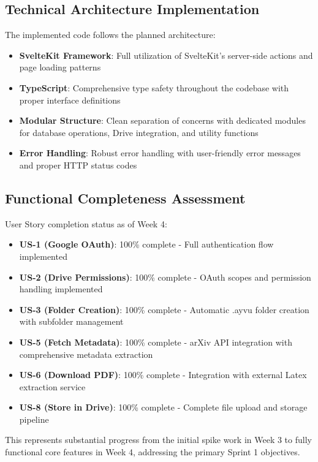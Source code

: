 \documentclass[12pt]{article}
\begin{document}
\subsection{Technical Architecture Implementation}
The implemented code follows the planned architecture:

\begin{itemize}
  \item \textbf{SvelteKit Framework}: Full utilization of SvelteKit's server-side actions and page loading patterns
  \item \textbf{TypeScript}: Comprehensive type safety throughout the codebase with proper interface definitions
  \item \textbf{Modular Structure}: Clean separation of concerns with dedicated modules for database operations, Drive integration, and utility functions
  \item \textbf{Error Handling}: Robust error handling with user-friendly error messages and proper HTTP status codes
\end{itemize}

\subsection{Functional Completeness Assessment}
User Story completion status as of Week 4:

\begin{itemize}
  \item \textbf{US-1 (Google OAuth)}: 100\% complete - Full authentication flow implemented
  \item \textbf{US-2 (Drive Permissions)}: 100\% complete - OAuth scopes and permission handling implemented
  \item \textbf{US-3 (Folder Creation)}: 100\% complete - Automatic .ayvu folder creation with subfolder management
  \item \textbf{US-5 (Fetch Metadata)}: 100\% complete - arXiv API integration with comprehensive metadata extraction
  \item \textbf{US-6 (Download PDF)}: 100\% complete - Integration with external Latex extraction service
  \item \textbf{US-8 (Store in Drive)}: 100\% complete - Complete file upload and storage pipeline
\end{itemize}

This represents substantial progress from the initial spike work in Week 3 to fully functional core features in Week 4, addressing the primary Sprint 1 objectives.
\end{document}
